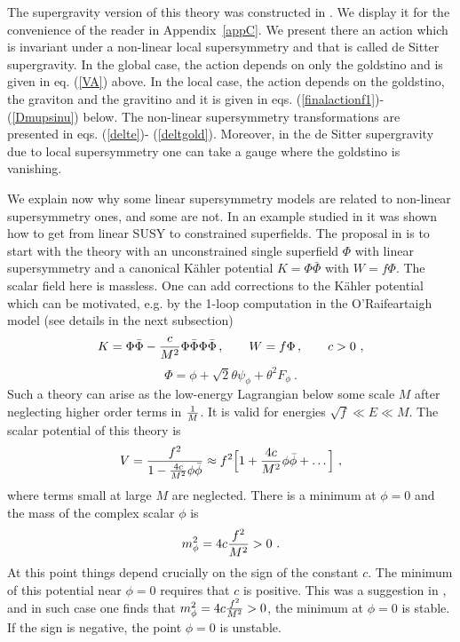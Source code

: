 \documentclass[11pt]{article}
\newcommand{\be}{\begin{equation}}
\newcommand{\ee}{\end{equation}}
\def\K{K{\"a}hler }
\newcommand{\rf}[1]{(\ref{#1})}
\def\be{\begin{equation}}
\def\ee{\end{equation}}
\begin{document}
The supergravity version of this theory was constructed in \cite{Bergshoeff:2015tra,Hasegawa:2015bza}. We display it for the convenience of the reader in Appendix~\ref{appC}. We present there an action which is invariant under a non-linear local supersymmetry and that is called de Sitter supergravity. In the global case, the action depends  on only the goldstino and is given in eq. \rf{VA} above. In the local case, the action depends on the goldstino, the graviton and the gravitino and it is given in eqs. \rf{finalactionf1}-\rf{Dmupsinu} below. The non-linear supersymmetry transformations are presented in eqs. \rf{delte}- \rf{deltgold}. Moreover, in the de Sitter supergravity due to local supersymmetry one can take a gauge where the goldstino is vanishing.

We explain now why some linear supersymmetry models are related to non-linear supersymmetry ones, and some are not. In an example studied in  \cite{Komargodski:2009rz} it was shown how to get from linear SUSY to constrained superfields. The proposal in \cite{Komargodski:2009rz} is to start with the theory with an unconstrained single superfield $\Phi$ with linear supersymmetry and a canonical \K potential $K= \Phi\bar \Phi$ with $W= f \Phi$. The scalar field here is massless. One can add corrections to the \K potential which can be motivated, e.g. by the 1-loop computation in the O'Raifeartaigh model \cite{ORaifeartaigh:1975nky} (see details in the next subsection)
\be
K= \Phi\bar \Phi - {c\over M^2} \Phi\bar \Phi \Phi \bar \Phi\, , \qquad W= f \Phi\, , \qquad  c>0 \ ,
\label{KS} \ee
\be
\Phi = \phi+ \sqrt 2 \theta \psi_{\phi} + \theta^2 F_{\phi} \ .
\ee
Such a theory can arise as the low-energy Lagrangian below some scale $M$ after neglecting higher order terms in ${1\over M}$. It is valid for energies $\sqrt f\ll E\ll M$. The scalar potential of this theory is
\be
V= {f^2\over 1-{4c\over M^2} \phi\bar \phi} \approx f^2 \Big [1+ {4 c\over M^2} \phi\bar \phi +  \dots \Big ] \ ,
\label{V}\ee 
where terms small at large $M$ are neglected. 
There is a   minimum at $\phi=0$ and the mass of the complex scalar $\phi$ is
\be
m^2_\phi = 4c {f^2\over M^2} >0  \ .
\label{mass}\ee
At this point things depend crucially on the sign of the constant $c$. The minimum of this potential near $\phi=0$ requires that $c$ is positive. This was a suggestion in  \cite{Komargodski:2009rz}, and in such case one finds that $m^2_\phi = 4c {f^2\over M^2} > 0$, the minimum at $\phi=0$ is stable. If the sign is negative, the point  $\phi=0$ is unstable. 
\end{document}
